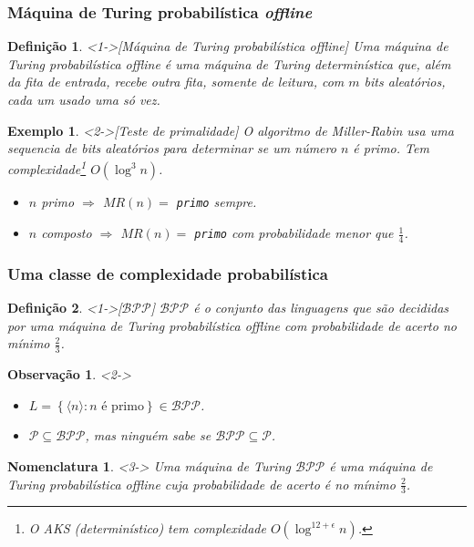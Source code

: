 \documentclass{beamer}
\def\chaves#1{\left\{ #1 \right\}} %
\def\cjpp#1#2{\chaves{#1\colon#2}} %
\def\clP{\mathcal{P}}
\def\clBPP{\mathcal{BPP}}
\def\codf#1{\langle #1\rangle}
\theoremstyle{teoaxicorlem}
\theoremstyle{defnotnom}
\newtheorem{Def}{Definição}
\newtheorem{Nom}{Nomenclatura}
\newtheorem{Ex}{Exemplo}
\newtheorem{Obs}{Observação}
\begin{document}
\begin{frame}
  \frametitle{Máquina de Turing probabilística \textit{offline}}
  \begin{Def}<1->[Máquina de Turing probabilística \textit{offline}]
    \footnotesize
    Uma \alert{máquina de Turing probabilística \textit{offline}}
    é uma máquina
    de Turing determinística que, além da fita de entrada, recebe outra
    fita, somente de leitura,
    com $m$ \textit{bits} aleatórios, cada um usado uma só vez.
  \end{Def}
  \vfill
  \begin{Ex}<2->[Teste de primalidade]
    \footnotesize
    O algoritmo de Miller-Rabin usa uma sequencia de \textit{bits}
    aleatórios para determinar se um número $n$ é primo. Tem
    complexidade\footnote{\tiny O AKS (determinístico) tem
      complexidade $O(\log^{12+\epsilon}n)$.} $O(\log^3 n)$.
    \begin{itemize}
    \item $n$ primo $\Longrightarrow$ $MR(n)=$ \texttt{primo} sempre.
    \item $n$ composto $\Longrightarrow$ $MR(n)=$ \texttt{primo} com
      probabilidade menor que $\frac14$.
    \end{itemize}
  \end{Ex}
\end{frame}

\begin{frame}
  \frametitle{Uma classe de complexidade probabilística}
  \begin{Def}<1->[$\clBPP$]
    \alert{$\clBPP$}
    é o conjunto das linguagens que são decididas por uma
    máquina de Turing probabilística \textit{offline} com probabilidade
    de acerto no mínimo $\frac23$.
  \end{Def}
  \vfill
  \begin{Obs}<2->
    \footnotesize
    \begin{itemize}
    \item
      $L=\cjpp{\codf n}{n\text{ é primo}}\in\clBPP$.
    \item
      $\clP\subseteq \clBPP$, mas ninguém sabe se $\clBPP\subseteq
      \clP$.
    \end{itemize}
  \end{Obs}
  \vfill
  \begin{Nom}<3->
    \footnotesize
    Uma \alert{máquina de Turing $\clBPP$}
    é uma máquina de Turing
    probabilística \textit{offline} cuja probabilidade de acerto é no
    mínimo $\frac23$.
  \end{Nom}
\end{frame}
\end{document}
